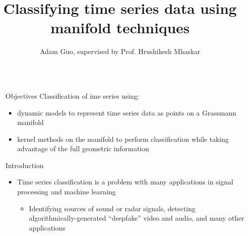 \documentclass[final]{beamer}
\title{Classifying time series data using manifold techniques} %
\author{Adam Guo, supervised by Prof. Hrushikesh Mhaskar} %
\institute{Pomona College ('22), Claremont Graduate University} %
\newlength{\sepwid}
\newlength{\onecolwid}
\begin{document}

\setlength{\belowcaptionskip}{2ex} %
\setlength\belowdisplayshortskip{2ex} %

\begin{frame}[t] %

\begin{columns}[t] %

\begin{column}{\sepwid}\end{column} %

\begin{column}{\onecolwid} %


\begin{alertblock}{Objectives}
   Classification of ime series using:
    \begin{itemize}
        \item dynamic models to represent time series data as points on a Grassmann manifold
        \item  kernel methods on the manifold to perform classification while taking
            advantage of the full geometric information
    \end{itemize}
\end{alertblock}


\begin{block}{Introduction}
    \begin{itemize}
        \item Time series classification is a  problem with many applications in signal processing and machine
            learning
\begin{itemize}
\item Identifying sources of sound or radar signals, detecting algorithmically-generated
            ``deepfake'' video and audio, and many other applications


\end{itemize}
\end{itemize}
\end{block}
\end{column}
\end{columns}
\end{frame}
\end{document}
